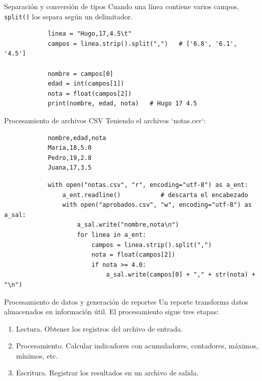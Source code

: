\documentclass{beamer}
\begin{document}
    \begin{frame}[fragile, t]{Separación y conversión de tipos}
        Cuando una línea contiene varios campos, \texttt{split()} los separa según un delimitador.

        \begin{verbatim}
            linea = "Hugo,17,4.5\t"
            campos = linea.strip().split(",")   # ['6.8', '6.1', '4.5']

            nombre = campos[0]
            edad = int(campos[1])
            nota = float(campos[2])
            print(nombre, edad, nota)   # Hugo 17 4.5
        \end{verbatim}
    \end{frame}

    \begin{frame}[fragile, t]{Procesamiento de archivos CSV}
        Teniendo el archivos `notas.csv`:
        \begin{verbatim}
            nombre,edad,nota
            Maria,18,5.0
            Pedro,19,2.8
            Juana,17,3.5
        \end{verbatim}

        \begin{verbatim}
            with open("notas.csv", "r", encoding="utf-8") as a_ent:
                a_ent.readline()           # descarta el encabezado
                with open("aprobados.csv", "w", encoding="utf-8") as a_sal:
                    a_sal.write("nombre,nota\n")
                    for linea in a_ent:
                        campos = linea.strip().split(",")
                        nota = float(campos[2])
                        if nota >= 4.0:
                            a_sal.write(campos[0] + "," + str(nota) + "\n")
        \end{verbatim}
    \end{frame}

    \begin{frame}[fragile, t]{Procesamiento de datos y generación de reportes}
        Un reporte transforma datos almacenados en información útil. El procesamiento sigue tres etapas:
        \begin{enumerate}
            \item Lectura. Obtener los registros del archivo de entrada.
            \item Procesamiento. Calcular indicadores con acumuladores, contadores, máximos, mínimos, etc.
            \item Escritura. Registrar los resultados en un archivo de salida.
        \end{enumerate}
    \end{frame}
\end{document}

